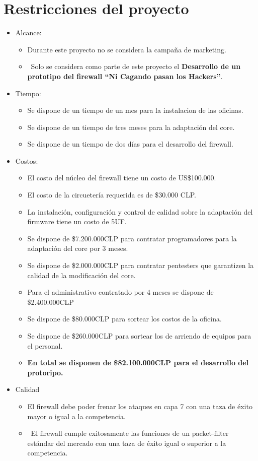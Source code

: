 \documentclass[11pt]{utalcaDoc}
\begin{document}
\section{ Restricciones del proyecto }
\begin{itemize}
  \item { Alcance: 
    \begin{itemize}
      \item{ Durante este proyecto no se considera la campaña de marketing. }
      \item { Solo se considera como parte de este proyecto el \textbf{Desarrollo de un prototipo del firewall ``Ni Cagando pasan los Hackers''}.}
    \end{itemize}
  }  
  \item { Tiempo:  
    \begin{itemize}
      \item{ Se dispone de un tiempo de un mes para la instalacion de las oficinas. }
      \item{ Se dispone de un tiempo de tres meses para la adaptación del core. }
      \item{ Se dispone de un tiempo de dos días para el desarrollo del firewall. }
    \end{itemize}
  }  
  \item { Costos: 
    \begin{itemize}
      \item{ El costo del núcleo del firewall tiene un costo de US\$100.000. }
      \item{ El costo de la circuetería requerida es de \$30.000 CLP.}
      \item{ La instalación, configuración y control de calidad sobre la adaptación del firmware tiene un costo de 5UF.}
      \item{ Se dispone de \$7.200.000CLP para contratar programadores para la adaptación del core por 3 meses.}
      \item{ Se dispone de \$2.000.000CLP para contratar pentesters que garantizen la calidad de la modificación del core. }
      \item{ Para el administrativo contratado por 4 meses se dispone de \$2.400.000CLP}
      \item{ Se dispone de \$80.000CLP para sortear los costos de la oficina.}
      \item{ Se dispone de \$260.000CLP para sortear los de arriendo de equipos para el personal.}
      \item{\textbf{ En total se disponen de \$82.100.000CLP para el desarrollo del protoripo.}}
    \end{itemize}
  }  

  \item { Calidad 
    \begin{itemize}
      \item{ El firewall debe poder frenar los ataques en capa 7 con una taza de éxito mayor o igual a la competencia. }
      \item{ El firewall cumple exitosamente las funciones de un packet-filter estándar del mercado con una taza de éxito igual o superior a la competencia.}
    \end{itemize}
  }  
\end{itemize}
\end{document}
